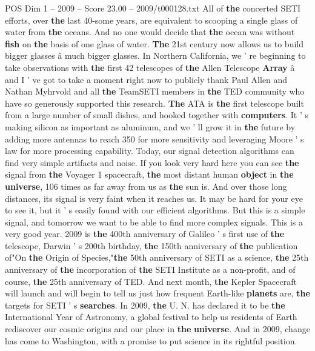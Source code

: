 \begin{textsample}{POS Dim 1 – 2009 – Score 23.00 – 2009/t000128.txt}
All of \textbf{the} concerted SETI efforts, over \textbf{the} last 40-some years, are equivalent to scooping a single glass of water from \textbf{the} oceans.
And no one would decide that \textbf{the} ocean was without \textbf{fish} on \textbf{the} basis of one glass of water. \textbf{The} 21st century now allows us to build bigger glasses â much bigger glasses.
In Northern California, we ' re beginning to take observations with \textbf{the} first 42 telescopes of \textbf{the} Allen Telescope \textbf{Array} â and I ' ve got to take a moment right now to publicly thank Paul Allen and Nathan Myhrvold and all \textbf{the} TeamSETI members in \textbf{the} TED community who have so generously supported this research. \textbf{The} ATA is \textbf{the} first telescope built from a large number of small dishes, and hooked together with \textbf{computers}.
It ' s making silicon as important as aluminum, and we ' ll grow it in \textbf{the} future by adding more antennas to reach 350 for more sensitivity and leveraging Moore ' s law for more processing capability.
Today, our signal detection algorithms can find very simple artifacts and noise.
If you look very hard here you can see \textbf{the} signal from \textbf{the} Voyager 1 spacecraft, \textbf{the} most distant human \textbf{object} in \textbf{the} \textbf{universe}, 106 times as far away from us as \textbf{the} sun is.
And over those long distances, its signal is very faint when it reaches us.
It may be hard for your eye to see it, but it ' s easily found with our efficient algorithms.
But this is a simple signal, and tomorrow we want to be able to find more complex signals.
This is a very good year. 2009 is \textbf{the} 400th anniversary of Galileo ' s first use of \textbf{the} telescope, Darwin ' s 200th birthday, \textbf{the} 150th anniversary of \textbf{the} publication of"On \textbf{the} Origin of Species,"\textbf{the} 50th anniversary of SETI as a science, \textbf{the} 25th anniversary of \textbf{the} incorporation of \textbf{the} SETI Institute as a non-profit, and of course, \textbf{the} 25th anniversary of TED.
And next month, \textbf{the} Kepler Spacecraft will launch and will begin to tell us just how frequent Earth-like \textbf{planets} are, \textbf{the} targets for SETI ' s \textbf{searches}.
In 2009, \textbf{the} U.
N. has declared it to be \textbf{the} International Year of Astronomy, a global festival to help us residents of Earth rediscover our cosmic origins and our place in \textbf{the} \textbf{universe}.
And in 2009, change has come to Washington, with a promise to put science in its rightful position.

\end{textsample}
